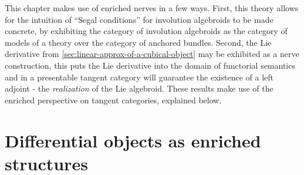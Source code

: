 This chapter makes use of enriched nerves in a few ways. First, this theory allows for the intuition of ``Segal conditions'' for involution algebroids to be made concrete, by exhibiting the category of involution algebroids as the category of models of a theory over the category of anchored bundles. Second, the Lie derivative from \cref{sec:linear-approx-of-a-cubical-object} may be exhibited as a nerve construction, this puts the Lie derivative into the domain of functorial semantics and in a presentable tangent category will guarantee the existence of a left adjoint - the \emph{realization} of the Lie algebroid. These results make use of the enriched perspective on tangent categories, explained below.

\section{Differential objects as enriched structures}%
\label{sec:diff-obs-enrichment}

